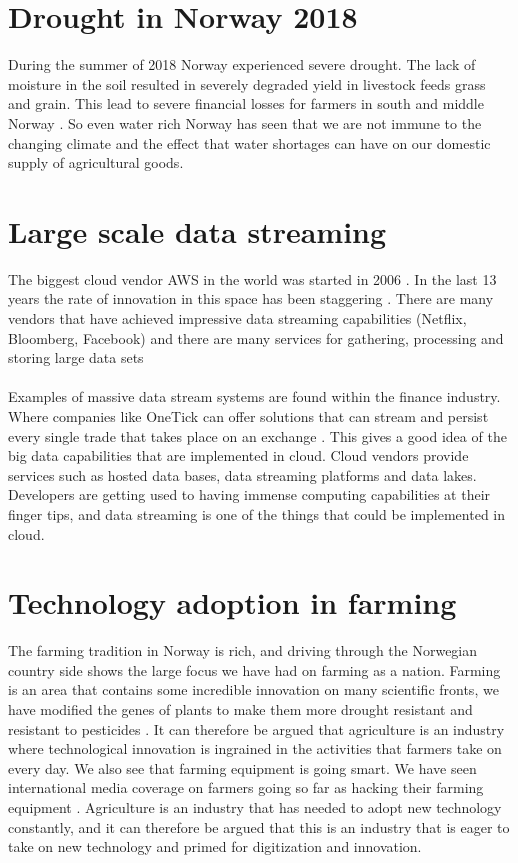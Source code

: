 \documentclass[]{uiophd}
\begin{document}
\section{Drought in Norway 2018}
 During the summer of 2018 Norway experienced severe drought. The lack of moisture in the soil resulted in severely degraded yield in livestock feeds grass and grain. This lead to severe financial losses for farmers in south and middle Norway \cite{nve}. So even water rich Norway has seen that we are not immune to the changing climate and the effect that water shortages can have on our domestic supply of agricultural goods. 

\section{Large scale data streaming }
The biggest cloud vendor AWS in the world was started in 2006 \cite{Gartner}. In the last 13 years the rate of innovation in this space has been staggering \cite{AWS}. There are many vendors that have achieved impressive data streaming capabilities (Netflix, Bloomberg, Facebook) and there are many services for gathering, processing and storing large data sets
\\\\
Examples of massive data stream systems are found within the finance industry. Where companies like OneTick can offer solutions that can stream and persist every single trade that takes place on an exchange  \cite{OneTick}. This gives a good idea of the big data capabilities that are implemented in cloud. Cloud vendors provide services such as hosted data bases, data streaming platforms and data lakes. Developers are getting used to having immense computing capabilities at their finger tips, and data streaming is one of the things that could be implemented in cloud.  
\section{Technology adoption in farming}
The farming tradition in Norway is rich, and driving through the Norwegian country side shows the large focus we have had on farming as a nation. Farming is an area that contains some incredible innovation on many scientific fronts, we have modified the genes of plants to make them more drought resistant and resistant to pesticides \cite{roundup}. It can therefore be argued that agriculture is an industry where technological innovation is ingrained in the activities that farmers take on every day. We also see that farming equipment is going smart. We have seen international media coverage on farmers going so far as hacking their farming equipment \cite{motherboard}. Agriculture is an industry that has needed to adopt new technology constantly, and it can therefore be argued that this is an industry that is eager to take on new technology and primed for digitization and innovation.
\end{document}
